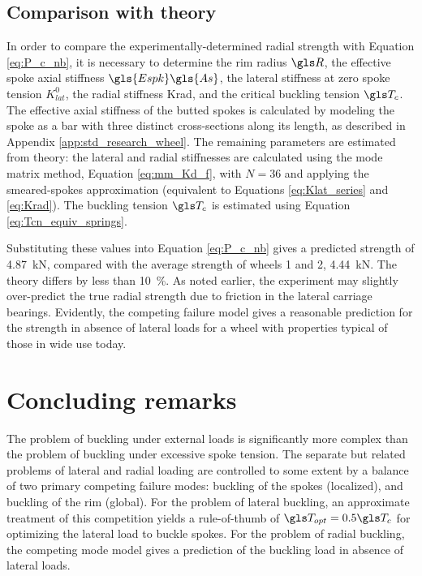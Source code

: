 \documentclass[\rootdir/thesis.tex]{subfiles}
\begin{document}
\subsection{Comparison with theory}
In order to compare the experimentally-determined radial strength with Equation \eqref{eq:P_c_nb}, it is necessary to determine the rim radius $\R$, the effective spoke axial stiffness $\gls{Espk}\gls{As}$, the lateral stiffness at zero spoke tension $K_{lat}^0$, the radial stiffness \gls{Krad}, and the critical buckling tension $\T_c$. The effective axial stiffness of the butted spokes is calculated by modeling the spoke as a bar with three distinct cross-sections along its length, as described in Appendix \ref{app:std_research_wheel}. The remaining parameters are estimated from theory: the lateral and radial stiffnesses are calculated using the mode matrix method, Equation \eqref{eq:mm_Kd_f}, with $N=36$ and applying the smeared-spokes approximation (equivalent to Equations \eqref{eq:Klat_series} and \eqref{eq:Krad}). The buckling tension $\T_c$ is estimated using Equation \eqref{eq:Tcn_equiv_springs}.

Substituting these values into Equation \eqref{eq:P_c_nb} gives a predicted strength of \SI{4.87}{kN}, compared with the average strength of wheels 1 and 2, \SI{4.44}{kN}. The theory differs by less than \SI{10}{\percent}. As noted earlier, the experiment may slightly over-predict the true radial strength due to friction in the lateral carriage bearings. Evidently, the competing failure model gives a reasonable prediction for the strength in absence of lateral loads for a wheel with properties typical of those in wide use today.

\section{Concluding remarks}

The problem of buckling under external loads is significantly more complex than the problem of buckling under excessive spoke tension. The separate but related problems of lateral and radial loading are controlled to some extent by a balance of two primary competing failure modes: buckling of the spokes (localized), and buckling of the rim (global). For the problem of lateral buckling, an approximate treatment of this competition yields a rule-of-thumb of $\T_{opt} = 0.5\T_c$ for optimizing the lateral load to buckle spokes. For the problem of radial buckling, the competing mode model gives a prediction of the buckling load in absence of lateral loads.
\end{document}
